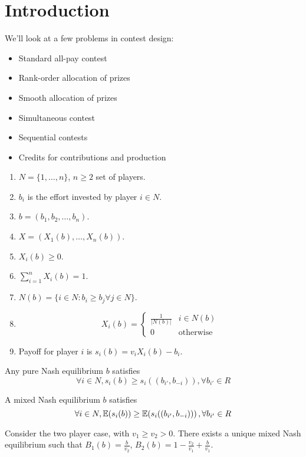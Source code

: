 
\chapter{Introduction}
\label{cha:introduction}

We'll look at a few problems in contest design:

\begin{itemize}
\item Standard all-pay contest
\item Rank-order allocation of prizes
\item Smooth allocation of prizes
\item Simultaneous contest
\item Sequential contests
\item Credits for contributions and production
\end{itemize}

\begin{defn}
  \label{defn:fundamentals:1}
  \begin{enumerate}
  \item $N = \{ 1, \dots, n \}$, $n \geq 2$ set of players.
  \item $b_{i}$ is the effort invested by player $i \in N$.
  \item $b = (b_{1}, b_{2}, \dots, b_{n})$.
  \item $X = (X_{1}(b), \dots, X_{n}(b))$.
  \item $X_{i}(b) \geq 0$.
  \item $\sum_{i=1}^{n} X_{i}(b) = 1$.
  \item $N(b) = \{ i \in N: b_{i} \geq b_{j} \forall j \in N \}$.
  \item \begin{equation}
      \label{eq:1}
      X_{i}(b) =
      \begin{cases}
        \frac{1}{|N(b)|} & i \in N(b) \\
        0 & \text{otherwise}
      \end{cases}
    \end{equation}
  \item Payoff for player $i$ is $s_{i}(b) = v_{i} X_{i}(b) - b_{i}$.
  \end{enumerate}
\end{defn}

Any pure Nash equilibrium $b$ satisfies
\begin{equation}
  \label{eq:2}
  \forall i \in N, s_{i}(b) \geq s_{i}((b_{i'}, b_{-i})), \forall
  b_{i'} \in R
\end{equation}

A mixed Nash equilibrium $b$ satisfies
\begin{equation}
  \label{eq:3}
  \forall i \in N, \E{s_{i}(b)} \geq \E{s_{i}((b_{i'}, b_{-i}))}, \forall b_{i'} \in R
\end{equation}

Consider the two player case, with $v_{1} \geq v_{2} > 0$.  There
exists a unique mixed Nash equilibrium such that $B_{1}(b) =
\frac{b}{v_{2}}$, $B_{2}(b) = 1 - \frac{v_{2}}{v_{1}} +
\frac{b}{v_{1}}$.



